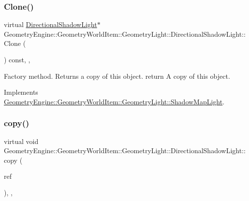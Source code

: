 \mbox{\label{class_geometry_engine_1_1_geometry_world_item_1_1_geometry_light_1_1_directional_shadow_light_ae5016cad41a62c4c870a942acc3f9afe}} 
\subsubsection{\texorpdfstring{Clone()}{Clone()}}
{\footnotesize\ttfamily virtual \mbox{\hyperlink{class_geometry_engine_1_1_geometry_world_item_1_1_geometry_light_1_1_directional_shadow_light}{Directional\+Shadow\+Light}}$\ast$ Geometry\+Engine\+::\+Geometry\+World\+Item\+::\+Geometry\+Light\+::\+Directional\+Shadow\+Light\+::\+Clone (\begin{DoxyParamCaption}{ }\end{DoxyParamCaption}) const\hspace{0.3cm}{\ttfamily [inline]}, {\ttfamily [override]}, {\ttfamily [virtual]}}

Factory method. Returns a copy of this object. return A copy of this object. 

Implements \mbox{\hyperlink{class_geometry_engine_1_1_geometry_world_item_1_1_geometry_light_1_1_shadow_map_light_a48eb6af2e6bb8487568ee4265fbc49ee}{Geometry\+Engine\+::\+Geometry\+World\+Item\+::\+Geometry\+Light\+::\+Shadow\+Map\+Light}}.

\mbox{\label{class_geometry_engine_1_1_geometry_world_item_1_1_geometry_light_1_1_directional_shadow_light_a9dfe76fbcd9c6f7047d99d7eff78c6a5}} 
\subsubsection{\texorpdfstring{copy()}{copy()}}
{\footnotesize\ttfamily virtual void Geometry\+Engine\+::\+Geometry\+World\+Item\+::\+Geometry\+Light\+::\+Directional\+Shadow\+Light\+::copy (\begin{DoxyParamCaption}\item[{const \mbox{\hyperlink{class_geometry_engine_1_1_geometry_world_item_1_1_geometry_light_1_1_directional_shadow_light}{Directional\+Shadow\+Light}} \&}]{ref }\end{DoxyParamCaption})\hspace{0.3cm}{\ttfamily [inline]}, {\ttfamily [protected]}, {\ttfamily [virtual]}}


